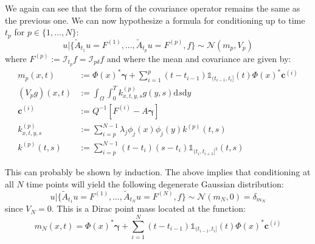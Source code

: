 \documentclass{article}
\theoremstyle{definition}
\theoremstyle{remark}
\theoremstyle{remark}
\begin{document}
\noindent We again can see that the form of the covariance operator remains the same as the previous one. We can now hypothesize a formula for conditioning up to time $t_p$ for $p\in\{1,\dots,N\}$:
\begin{equation}
    u|\{\tilde{A}_{t_1}u=F^{(1)},\dots,\tilde{A}_{t_p}u=F^{(p)},f\}\sim\mathcal{N}(m_p,V_p)
\end{equation}
where $F^{(p)}:=\mathcal{I}_{t_p}f=\mathcal{I}_{p\delta}f$ and where the mean and covariance are given by:
\begin{align}
    m_{p}(x,t) &:= \Phi(x)^{*}\boldsymbol{\gamma} + \sum_{i=1}^{p}(t-t_{i-1})\mathbb{1}_{(t_{i-1},t_i]}(t)\Phi(x)^{*}\boldsymbol{c}^{(i)} \\
    (V_{p}g)(x,t) &:= \int_{\Omega}\int_{0}^{T}k_{x,t,y,s}^{(p)}g(y,s)\mathrm{d}s\mathrm{d}y \\
    \boldsymbol{c}^{(i)} &:= Q^{-1}\left[F^{(i)}-A\boldsymbol{\gamma}\right] \\
    k_{x,t,y,s}^{(p)} &:= \sum_{i=p}^{N-1}\lambda_{j}\phi_{j}(x)\phi_{j}(y)k^{(p)}(t,s) \\
    k^{(p)}(t,s) &:= \sum_{i=p}^{N-1}(t-t_i)(s-t_i)\mathbb{1}_{(t_i,t_{i+1}]^2}(t,s)
\end{align}

\noindent This can probably be shown by induction. The above implies that conditioning at all $N$ time points will yield the following degenerate Gaussian distribution:
\begin{equation}
    u|\{\tilde{A}_{t_1}u=F^{(1)},\dots,\tilde{A}_{t_N}u=F^{(N)},f\}\sim\mathcal{N}(m_N,0)=\delta_{m_N}
\end{equation}
since $V_N=0$. This is a Dirac point mass located at the function:
\begin{equation}
    m_N(x,t)=\Phi(x)^{*}\boldsymbol{\gamma}+\sum_{i=1}^{N}(t-t_{i-1})\mathbb{1}_{(t_{i-1},t_i]}(t)\Phi(x)^{*}\boldsymbol{c}^{(i)}
\end{equation}
\end{document}
